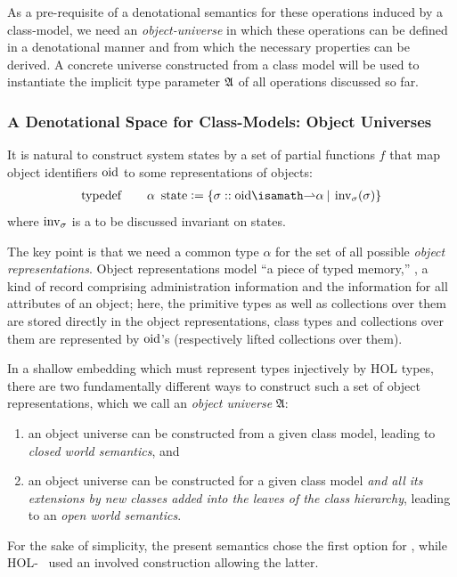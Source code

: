 As a pre-requisite of a denotational semantics for these operations induced
by a class-model, we need an \emph{object-universe} in which these operations can
be defined in a denotational manner and from which the necessary properties
can be derived. A concrete universe constructed from a class model will be 
used to instantiate the implicit type parameter $\mathfrak{A}$ of all \OCL operations
discussed so far.

\subsubsection{A Denotational Space for Class-Models: Object Universes}

It is natural to construct system states by a set of partial functions
$f$ that map object identifiers $\mathrm{oid}$ to some representations of
objects:
\begin{gather}
       \typedef \qquad \alpha~\state{} \defeq \{ \sigma ::
        \oid \isasymrightharpoonup \alpha \ap|\ap \inv_\sigma(\sigma) \}
\end{gather}
where $\operatorname{inv}_\sigma$ is a to be discussed invariant on states.

The key point is that we need a common type $\alpha$ for the set of all
possible \emph{object representations}.  Object representations model
``a piece of typed memory,'' \ie, a kind of record comprising
administration information and the information for all attributes of
an object; here, the primitive types as well as collections over them
are stored directly in the object representations, class types and
collections over them are represented by $\mathrm{oid}$'s (respectively lifted
collections over them).

In a shallow embedding which must represent
\UML types injectively by HOL types, there are two fundamentally
different ways to construct such a set of object representations,
which we call an \emph{object universe} $\mathfrak{A}$:
\begin{enumerate}
\item an object universe can be constructed from a given class model,
  leading to \emph{closed world semantics}, and
\item an object universe can be constructed for a given class model
  \emph{and all its extensions by new classes added into the leaves of
    the class hierarchy}, leading to an \emph{open world semantics}.
\end{enumerate}
For the sake of simplicity, the present semantics chose the first option for
 \FOCL, while HOL-\OCL~\cite{brucker.ea:extensible:2008-b}
used an involved construction allowing the latter.

